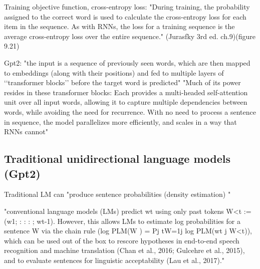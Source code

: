 






Training objective function, cross-entropy loss:
 "During training, the probability assigned to the correct word is used to calculate the cross-entropy loss for each item in the sequence. As with RNNs, the loss for a training sequence is the average cross-entropy loss over the entire sequence." (Jurasfky 3rd ed. ch.9)(figure 9.21)


Gpt2:
"the input is a sequence of previously seen words, which are then mapped to embeddings (along with their positions) and fed to multiple layers of ‘‘transformer blocks’’
before the target word is predicted" \citep{lau2020furiously}
"Much of its power resides in these transformer blocks: Each
provides a multi-headed self-attention unit over all input words, allowing it to capture multiple dependencies between words, while avoiding the need for recurrence. With no need to process a sentence in sequence, the model parallelizes more efficiently, and scales in a way that RNNs cannot" \citep{lau2020furiously}

\pagebreak

\subsection{Traditional unidirectional language models (Gpt2)}

Traditional LM can "produce sentence probabilities (density estimation) " \citep{salazar2020masked}

"conventional language models (LMs) predict wt using only past tokens W<t := (w1; : : : ; wt-1). However, this allows LMs to estimate log probabilities for a sentence W via the chain rule (log PLM(W ) = Pj tW=1j log PLM(wt j W<t)), which can be used out of the box to rescore hypotheses in end-to-end speech recognition and machine translation (Chan et al., 2016; Gulcehre
et al., 2015), and to evaluate sentences for linguistic
acceptability (Lau et al., 2017)."  \citep{salazar2020masked}

